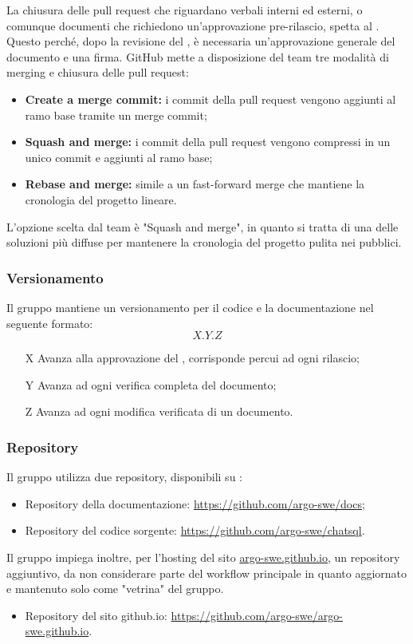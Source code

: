 \par La chiusura delle pull request che riguardano verbali interni ed esterni, o comunque documenti che richiedono un’approvazione pre-rilascio, spetta al \Responsabile{}. Questo perché, dopo la revisione del \Verificatore{}, è necessaria un’approvazione generale del documento e una firma. GitHub mette a disposizione del team tre modalità di merging e chiusura delle pull request:
\begin{itemize}
  \item \textbf{Create a merge commit:} i commit della pull request vengono aggiunti al ramo base tramite un merge commit;
  \item \textbf{Squash and merge:} i commit della pull request vengono compressi in un unico commit e aggiunti al ramo base;
  \item \textbf{Rebase and merge:} simile a un fast-forward merge che mantiene la cronologia del progetto lineare.
\end{itemize}
\par L'opzione scelta dal team è "Squash and merge", in quanto si tratta di una delle soluzioni più diffuse per mantenere la cronologia del progetto pulita nei  pubblici.

\subsubsection{Versionamento}
Il gruppo mantiene un versionamento per il codice e la documentazione nel seguente formato:
\[ X.Y.Z \]
\begin{itemize}
  \item[X] Avanza alla approvazione del \Responsabile{}, corrisponde percui ad ogni rilascio;
  \item[Y] Avanza ad ogni verifica completa del documento;
  \item[Z] Avanza ad ogni modifica verificata di un documento.
\end{itemize}

\subsubsection{Repository}
Il gruppo utilizza due repository, disponibili su :
\begin{itemize}
  \item Repository della documentazione: \href{https://github.com/argo-swe/docs}{https://github.com/argo-swe/docs};
  \item Repository del codice sorgente: \href{https://github.com/argo-swe/chatsql}{https://github.com/argo-swe/chatsql}.
\end{itemize}
Il gruppo impiega inoltre, per l'hosting del sito \href{https://argo-swe.github.io}{argo-swe.github.io}, un repository aggiuntivo, da non considerare parte del workflow principale in quanto aggiornato e mantenuto solo come "vetrina" del gruppo.
\begin{itemize}
  \item Repository del sito github.io: \href{https://github.com/argo-swe/argo-swe.github.io}{https://github.com/argo-swe/argo-swe.github.io}.
\end{itemize}

